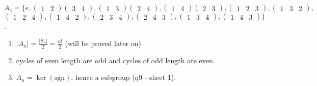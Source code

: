 \begin{example}
$A_4 = \{ e, \begin{pmatrix}1 & 2\end{pmatrix} \begin{pmatrix}3 & 4\end{pmatrix}, \begin{pmatrix}1 & 3\end{pmatrix} \begin{pmatrix}2 & 4\end{pmatrix}, \begin{pmatrix}1 & 4\end{pmatrix} \begin{pmatrix}2 & 3\end{pmatrix},\begin{pmatrix}1 & 2 & 3\end{pmatrix}, \begin{pmatrix}1 & 3 & 2\end{pmatrix},$ \\
$\begin{pmatrix}1 & 2 & 4\end{pmatrix}, \begin{pmatrix}1 & 4 & 2\end{pmatrix},\begin{pmatrix}2 & 3 & 4\end{pmatrix}, \begin{pmatrix}2 & 4 & 3\end{pmatrix}, \begin{pmatrix}1 & 3 & 4\end{pmatrix}, \begin{pmatrix}1 & 4 & 3\end{pmatrix} \}$.
\end{example}

\begin{remark} \mbox{}
  \begin{enumerate}
  \def\labelenumi{\roman{enumi}.}
  \item
    \(|A_n| = \frac{|S_n|}{2} = \frac{n!}{2}\) (will be proved later on)
  \item
    cycles of even length are odd and cycles of odd length are even.
  \item
    \(A_n = \ker (\text{sgn})\), hence a subgroup (q9 - sheet 1).
  \end{enumerate}
\end{remark}